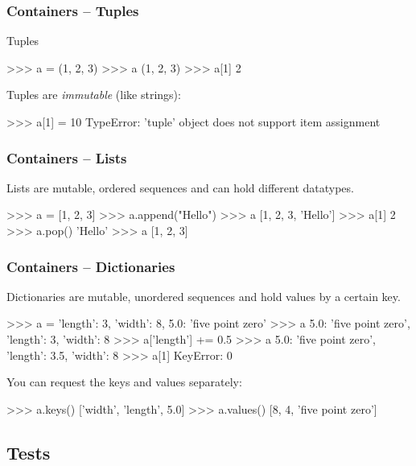 \documentclass[xetex,10pt]{beamer}
\def\spacer{\vspace*{1em}}
\begin{document}
\begin{frame}[fragile]
	\frametitle{Containers -- Tuples}

Tuples
\begin{python}
>>> a = (1, 2, 3)
>>> a
(1, 2, 3)
>>> a[1]
2
\end{python}

	\spacer
	\pause
Tuples are \emph{immutable} (like strings):
\begin{python}
>>> a[1] = 10
TypeError: 'tuple' object does not support item assignment
\end{python}
\end{frame}

\begin{frame}[fragile]
	\frametitle{Containers -- Lists}

Lists are mutable, ordered sequences and can hold different datatypes.
\begin{python}
>>> a = [1, 2, 3]
>>> a.append("Hello")
>>> a
[1, 2, 3, 'Hello']
>>> a[1]
2
>>> a.pop()
'Hello'
>>> a
[1, 2, 3]
\end{python}

\end{frame}

\begin{frame}[fragile]
	\frametitle{Containers -- Dictionaries}

Dictionaries are mutable, unordered sequences and hold values by a certain key.
\begin{python}
>>> a = {'length': 3, 'width': 8, 5.0: 'five point zero'}
>>> a
{5.0: 'five point zero', 'length': 3, 'width': 8}
>>> a['length'] += 0.5
>>> a
{5.0: 'five point zero', 'length': 3.5, 'width': 8}
>>> a[1]
KeyError: 0
\end{python}


	\spacer
	\pause
You can request the keys and values separately:

\begin{python}
>>> a.keys()
['width', 'length', 5.0]
>>> a.values()
[8, 4, 'five point zero']
\end{python}

\end{frame}

\subsection{Tests}
\end{document}
